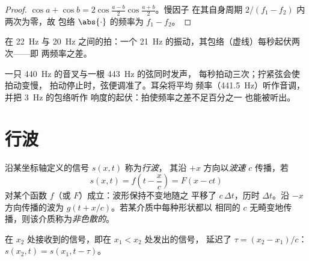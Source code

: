 \begin{proof}
$\cos a + \cos b = 2\cos\frac{a - b}{2}\cos\frac{a + b}{2}$。慢因子
在其自身周期 $2/(f_1 - f_2)$ 内两次为零，故
包络 $\abs{\cdot}$ 的频率为 $f_1 - f_2$。
\end{proof}

\begin{omfigure}

{\small 在 \qty{22}{Hz} 与 \qty{20}{Hz} 之间的拍：一个 \qty{21}{Hz}
的振动，其包络（虚线）每秒起伏两次——即
两频率之差。}
\end{omfigure}

\begin{example}[凭耳朵调音]\label{ex:b1:wave-propagation:tuning}
一只 \qty{440}{Hz} 的音叉与一根 \qty{443}{Hz} 的弦同时发声，
每秒拍动三次；拧紧弦会使拍动变慢，
拍动停止时，弦便调准了。耳朵将平均
频率（\qty{441.5}{Hz}）听作音调，并把 \qty{3}{Hz} 的包络听作
响度的起伏：拍使频率之差不足百分之一
也能被听出。
\end{example}

\section{行波}

\begin{definition}[行波；波速]\label{def:b1:wave-propagation:travelling}
沿某坐标轴定义的信号 $s(x, t)$ 称为\emph{行波}，
其沿 $+x$ 方向以\emph{波速} $c$ 传播，若
\[
s(x, t) = f\!\left(t - \frac{x}{c}\right) = F(x - ct)
\]
对某个函数 $f$（或 $F$）成立：波形保持不变地随之
平移了 $c\,\Delta t$，历时 $\Delta t$。沿 $-x$ 方向传播的波为
$g(t + x/c)$。若某介质中每种形状都以
相同的 $c$ 无畸变地传播，则该介质称为\emph{非色散的}。
\end{definition}

\begin{proposition}[延迟]\label{prop:b1:wave-propagation:delay}
在 $x_2$ 处接收到的信号，即在 $x_1 < x_2$ 处发出的信号，
延迟了 $\tau = (x_2 - x_1)/c$：$s(x_2, t) = s(x_1, t - \tau)$。
\end{proposition}

